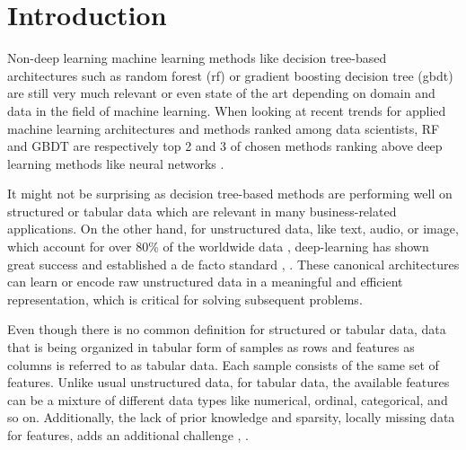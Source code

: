 \documentclass[../main.tex]{subfiles}
\begin{document}
\section{Introduction} \label{sec:introduction}

Non-deep learning machine learning methods like decision tree-based architectures such as random forest (\acs{rf}) or gradient boosting decision tree (\acs{gbdt}) are still very much relevant or even state of the art depending on domain and data in the field of machine learning. When looking at recent trends for applied machine learning architectures and methods ranked among data scientists, RF and GBDT are respectively top 2 and 3 of chosen methods ranking above deep learning methods like neural networks \cite{c_kaggle2020}.
\newline

It might not be surprising as decision tree-based methods are performing well on structured or tabular data which are relevant in many business-related applications. On the other hand, for unstructured data, like text, audio, or image, which account for over 80\% of the worldwide data \cite{c_amount_unstructureddata}, deep-learning has shown great success and established a de facto standard \cite{he_deep_2015}, \cite{devlin_bert_2019}. These canonical architectures can learn or encode raw unstructured data in a meaningful and efficient representation, which is critical for solving subsequent problems.
\newline

Even though there is no common definition for structured or tabular data, data that is being organized in tabular form of samples as rows and features as columns is referred to as tabular data. Each sample consists of the same set of features. Unlike usual unstructured data, for tabular data, the available features can be a mixture of different data types like numerical, ordinal, categorical, and so on. Additionally, the lack of prior knowledge and sparsity, locally missing data for features, adds an additional challenge \cite{c_struc_vs_unstruc}, \cite{shwartz-ziv_tabular_2021}.
\newline
\end{document}
